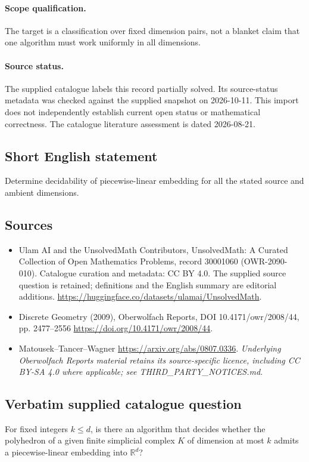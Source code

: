 \documentclass[11pt]{article}
\begin{document}
\paragraph{Scope qualification.}
The target is a classification over fixed dimension pairs, not a blanket claim that one algorithm must work uniformly in all dimensions.
\paragraph{Source status.}
The supplied catalogue labels this record partially solved. Its source-status metadata was checked against the supplied snapshot on 2026-10-11. This import does not independently establish current open status or mathematical correctness. The catalogue literature assessment is dated 2026-08-21.
\subsection{Short English statement}
Determine decidability of piecewise-linear embedding for all the stated source and ambient dimensions.
\subsection{Sources}
\begin{itemize}
\item[S1] Ulam AI and the UnsolvedMath Contributors, UnsolvedMath: A Curated Collection of Open Mathematics Problems, record 30001060 (OWR-2090-010). Catalogue curation and metadata: CC BY 4.0. The supplied source question is retained; definitions and the English summary are editorial additions.
\url{https://huggingface.co/datasets/ulamai/UnsolvedMath}.
\item[S2] Discrete Geometry (2009), Oberwolfach Reports, DOI 10.4171/owr/2008/44, pp. 2477--2556
\url{https://doi.org/10.4171/owr/2008/44}.
\item[S3] Matousek--Tancer--Wagner
\url{https://arxiv.org/abs/0807.0336}.
\textit{Underlying Oberwolfach Reports material retains its source-specific licence, including CC BY-SA 4.0 where applicable; see THIRD\_PARTY\_NOTICES.md.}
\end{itemize}
\subsection{Verbatim supplied catalogue question}
For fixed integers $k\leq d$, is there an algorithm that decides whether the polyhedron of a given finite simplicial complex $K$ of dimension at most $k$ admits a piecewise-linear embedding into $\mathbb R^d$?
\end{document}
